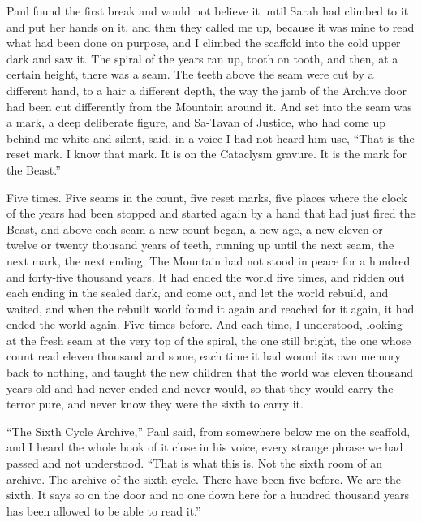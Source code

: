 Paul found the first break and would not believe it until Sarah had climbed to it and put her hands on it, and then they called me up, because it was mine to read what had been done on purpose, and I climbed the scaffold into the cold upper dark and saw it. The spiral of the years ran up, tooth on tooth, and then, at a certain height, there was a seam. The teeth above the seam were cut by a different hand, to a hair a different depth, the way the jamb of the Archive door had been cut differently from the Mountain around it. And set into the seam was a mark, a deep deliberate figure, and Sa-Tavan of Justice, who had come up behind me white and silent, said, in a voice I had not heard him use, ``That is the reset mark. I know that mark. It is on the Cataclysm gravure. It is the mark for the Beast.''\par

Five times. Five seams in the count, five reset marks, five places where the clock of the years had been stopped and started again by a hand that had just fired the Beast, and above each seam a new count began, a new age, a new eleven or twelve or twenty thousand years of teeth, running up until the next seam, the next mark, the next ending. The Mountain had not stood in peace for a hundred and forty-five thousand years. It had ended the world five times, and ridden out each ending in the sealed dark, and come out, and let the world rebuild, and waited, and when the rebuilt world found it again and reached for it again, it had ended the world again. Five times before. And each time, I understood, looking at the fresh seam at the very top of the spiral, the one still bright, the one whose count read eleven thousand and some, each time it had wound its own memory back to nothing, and taught the new children that the world was eleven thousand years old and had never ended and never would, so that they would carry the terror pure, and never know they were the sixth to carry it.\par

``The Sixth Cycle Archive,'' Paul said, from somewhere below me on the scaffold, and I heard the whole book of it close in his voice, every strange phrase we had passed and not understood. ``That is what this is. Not the sixth room of an archive. The archive of the sixth cycle. There have been five before. We are the sixth. It says so on the door and no one down here for a hundred thousand years has been allowed to be able to read it.''\par

